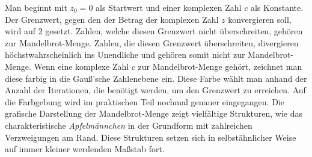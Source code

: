 \noindent
Man beginnt mit $z_{0} = 0$ als Startwert und einer komplexen Zahl $c$ als Konstante.
Der Grenzwert, gegen den der Betrag der komplexen Zahl $z$ konvergieren soll, wird auf 2 gesetzt. Zahlen, welche diesen Grenzwert nicht überschreiten, gehören zur Mandelbrot-Menge. \newline
Zahlen, die diesen Grenzwert überschreiten, divergieren höchstwahrscheinlich ins Unendliche und gehören somit nicht zur Mandelbrot-Menge. \hfill \break \newline
\noindent
Wenn eine komplexe Zahl $c$ zur Mandelbrot-Menge gehört, zeichnet man diese
farbig in die Gauß'sche Zahlenebene ein. Diese Farbe wählt man anhand der
Anzahl der Iterationen, die benötigt werden, um den Grenzwert zu erreichen. Auf
die Farbgebung wird im praktischen Teil nochmal genauer eingegangen. \hfill \break \newline
\noindent
Die grafische Darstellung der Mandelbrot-Menge zeigt vielfältige Strukturen,
wie das charakteristische \textit{Apfelmännchen} in der Grundform mit
zahlreichen Verzweigungen am Rand. Diese Strukturen setzen sich in
selbstähnlicher Weise auf immer kleiner werdenden Maßstab fort.

